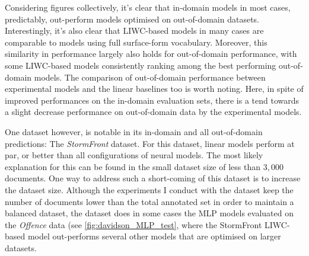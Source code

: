 Considering figures collectively, it's clear that in-domain models in most cases, predictably, out-perform models optimised on out-of-domain datasets.
Interestingly, it's also clear that LIWC-based models in many cases are comparable to models using full surface-form vocabulary.
Moreover, this similarity in performance largely also holds for out-of-domain performance, with some LIWC-based models consistently ranking among the best performing out-of-domain models.
The comparison of out-of-domain performance between experimental models and the linear baselines too is worth noting.
Here, in spite of improved performances on the in-domain evaluation sets, there is a tend towards a slight decrease performance on out-of-domain data by the experimental models.

One dataset however, is notable in its in-domain and all out-of-domain predictions: The \textit{StormFront} dataset.
For this dataset, linear models perform at par, or better than all configurations of neural models.
The most likely explanation for this can be found in the small dataset size of less than $3,000$ documents.
One way to address such a short-coming of this dataset is to increase the dataset size.
Although the experiments I conduct with the dataset keep the number of documents lower than the total annotated set in order to maintain a balanced dataset, the dataset does in some cases 
the MLP models evaluated on the \textit{Offence} data (see \cref{fig:davidson_MLP_test}, where the StormFront LIWC-based model out-performs several other models that are optimised on larger datasets.

